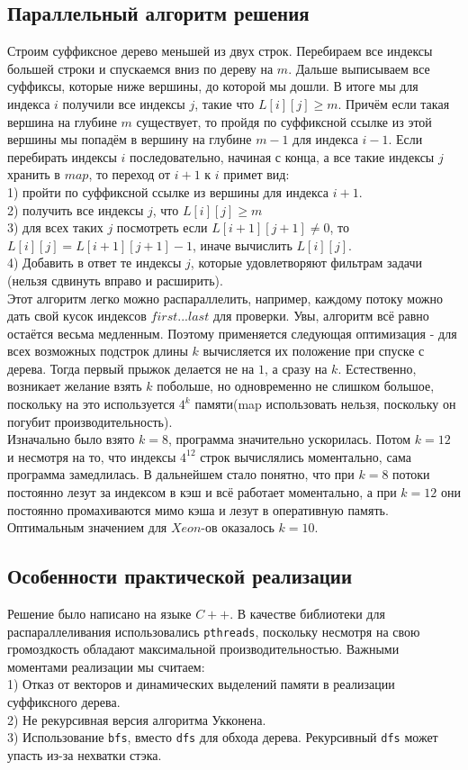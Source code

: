 \documentclass[12pt,a4paper]{article}
\begin{document}
\subsection{Параллельный алгоритм решения}
Строим суффиксное дерево меньшей из двух строк. Перебираем все индексы большей строки и спускаемся вниз по дереву на 
$m$. Дальше выписываем все суффиксы, которые ниже вершины, до которой мы дошли. В итоге мы для индекса $i$ получили все индексы $j$, такие что $L[i][j] \geq m$. Причём если такая вершина на глубине $m$ существует, то пройдя по суффиксной ссылке из этой вершины мы попадём в вершину на глубине $m - 1$ для индекса $i - 1$. Если перебирать индексы $i$ последовательно, начиная с конца, а все такие индексы $j$ хранить в $map$, то переход от $i + 1$ к $i$ примет вид:
\\
1) пройти по суффиксной ссылке из вершины для индекса $i + 1$.
\\
2) получить все индексы $j$, что $L[i][j] \geq m$
\\
3) для всех таких $j$ посмотреть если $L[i+1][j+1] \neq 0$, то $L[i][j] = L[i+1][j+1]-1$, иначе вычислить $L[i][j]$. 
\\
4) Добавить в ответ те индексы $j$, которые удовлетворяют фильтрам задачи (нельзя сдвинуть вправо и расширить).
\\
Этот алгоритм легко можно распараллелить, например, каждому потоку можно дать свой кусок индексов $first...last$ для проверки. Увы, алгоритм всё равно остаётся весьма медленным. Поэтому применяется следующая оптимизация - для всех возможных подстрок длины $k$ вычисляется их положение при спуске с дерева. Тогда первый прыжок делается не на $1$, а сразу на $k$. Естественно, возникает желание взять $k$ побольше, но одновременно не слишком большое, поскольку на это используется $4^k$ памяти(map использовать нельзя, поскольку он погубит производительность).
\\
Изначально было взято $k=8$, программа значительно ускорилась. Потом $k=12$ и несмотря на то, что индексы $4^{12}$ строк вычислялись моментально, сама программа замедлилась. В дальнейшем стало понятно, что при $k=8$ потоки постоянно лезут за индексом в кэш и всё работает моментально, а при $k=12$ они постоянно промахиваются мимо кэша и лезут в оперативную память. Оптимальным значением для $Xeon$-ов оказалось $k=10$.

\subsection{Особенности практической реализации}
Решение было написано на языке $C++$. В качестве библиотеки для распараллеливания использовались \texttt{pthreads}, поскольку несмотря на свою громоздкость обладают максимальной производительностью.
Важными моментами реализации мы считаем:
\\
1) Отказ от векторов и динамических выделений памяти в реализации суффиксного дерева.
\\
2) Не рекурсивная версия алгоритма Укконена.
\\
3) Использование \texttt{bfs}, вместо \texttt{dfs} для обхода дерева. Рекурсивный \texttt{dfs} может упасть из-за нехватки стэка.
\end{document}
